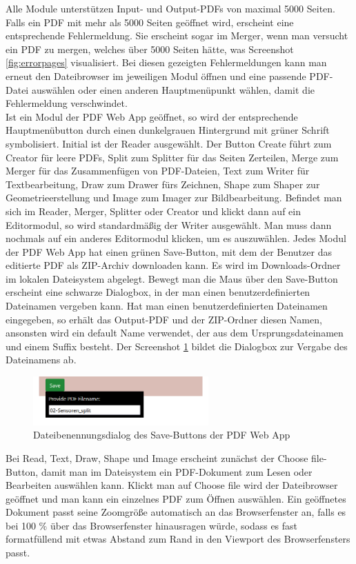 Alle Module unterstützen Input- und Output-PDFs von maximal 5000 Seiten. Falls ein PDF mit mehr als 5000 Seiten geöffnet wird, erscheint eine entsprechende Fehlermeldung. Sie erscheint sogar im Merger, wenn man versucht ein PDF zu mergen, welches über 5000 Seiten hätte, was Screenshot \ref{fig:errorpages} visualisiert. Bei diesen gezeigten Fehlermeldungen kann man erneut den Dateibrowser im jeweiligen Modul öffnen und eine passende PDF-Datei auswählen oder einen anderen Hauptmenüpunkt wählen, damit die Fehlermeldung verschwindet. \\
Ist ein Modul der PDF Web App geöffnet, so wird der entsprechende Hauptmenübutton durch einen dunkelgrauen Hintergrund mit grüner Schrift symbolisiert. Initial ist der Reader ausgewählt. Der Button Create führt zum Creator für leere PDFs, Split zum Splitter für das Seiten Zerteilen, Merge zum Merger für das Zusammenfügen von PDF-Dateien, Text zum Writer für Textbearbeitung, Draw zum Drawer fürs Zeichnen, Shape zum Shaper zur Geometrieerstellung und Image zum Imager zur Bildbearbeitung. Befindet man sich im Reader, Merger, Splitter oder Creator und klickt dann auf ein Editormodul, so wird standardmäßig der Writer ausgewählt. Man muss dann nochmals auf ein anderes Editormodul klicken, um es auszuwählen. Jedes Modul der PDF Web App hat einen grünen Save-Button, mit dem der Benutzer das editierte PDF als ZIP-Archiv downloaden kann. Es wird im Downloads-Ordner im lokalen Dateisystem abgelegt. Bewegt man die Maus über den Save-Button erscheint eine schwarze Dialogbox, in der man einen benutzerdefinierten Dateinamen vergeben kann. Hat man einen benutzerdefinierten Dateinamen eingegeben, so erhält das Output-PDF und der ZIP-Ordner diesen Namen, ansonsten wird ein default Name verwendet, der aus dem Ursprungsdateinamen und einem Suffix besteht. Der Screenshot \ref{fig:save} bildet die Dialogbox zur Vergabe des Dateinamens ab. 

\begin{figure}[!htbp]
	\centering
	\includegraphics[width=0.6\textwidth]{"images/save.png"}
	\caption{Dateibenennungsdialog des Save-Buttons der PDF Web App}
	\label{fig:save}
\end{figure}

Bei Read, Text, Draw, Shape und Image erscheint zunächst der Choose file-Button, damit man im Dateisystem ein PDF-Dokument zum Lesen oder Bearbeiten auswählen kann. Klickt man auf Choose file wird der Dateibrowser geöffnet und man kann ein einzelnes PDF zum Öffnen auswählen. Ein geöffnetes Dokument passt seine Zoomgröße automatisch an das Browserfenster an, falls es bei 100 \% über das Browserfenster hinausragen würde, sodass es fast formatfüllend mit etwas Abstand zum Rand in den Viewport des Browserfensters passt. 

